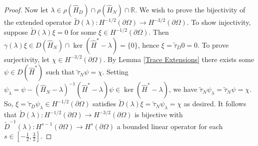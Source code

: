 \documentclass{article}
\numberwithin{equation}{section}
\begin{document}
\begin{proof}
    Now let $\lambda \in \rho(\hat{H}_D)\cap \rho(\hat{H}_N)\cap \mathbb{R}$. We wish to prove the bijectivity of the extended operator $\tilde{D}(\lambda):H^{-1/2}(\partial \Omega)\to H^{-3/2}(\partial \Omega)$. To show injectivity, suppose $\tilde{D}(\lambda)\xi=0$ for some $\xi \in H^{-1/2}(\partial \Omega)$. Then $\gamma(\lambda)\xi \in D(\hat{H}_N)\cap\ker(\hat{H}^*-\lambda)=\{0\}$, hence $\xi=\tilde{\tau}_D0=0$. To prove surjectivity, let $\chi \in H^{-3/2}(\partial \Omega)$. By Lemma \ref{Trace Extensions} there exists some $\psi \in D(\hat{H}^*)$ such that $\tilde{\tau}_N\psi=\chi$. Setting $\psi_\lambda=\psi-(\hat{H}_N - \lambda)^{-1}(\hat{H}^*-\lambda)\psi\in \ker(\hat{H}^*-\lambda)$, we have $\tilde{\tau}_N\psi_\lambda=\tilde{\tau}_N\psi=\chi$. So, $\xi=\tilde{\tau}_D\psi_\lambda \in H^{-1/2}(\partial \Omega)$ satisfies $\tilde{D}(\lambda)\xi=\tilde{\tau}_N \psi_\lambda=\chi$ as desired. It follows that $\tilde{D}(\lambda):H^{-1/2}(\partial \Omega)\to H^{-3/2}(\partial \Omega)$ is bijective with $\tilde{D}^{-1}(\lambda):H^{s-1}(\partial \Omega)\to H^s(\partial \Omega)$ a bounded linear operator for each $s \in [-\frac{1}{2}, \frac{3}{2}]$.
\end{proof}
\end{document}
